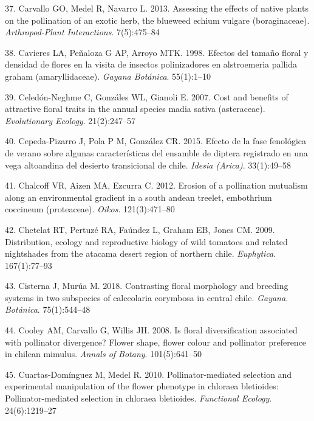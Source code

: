 \documentclass[
]{article}
\begin{document}
\leavevmode\hypertarget{ref-RN115}{}%
37. Carvallo GO, Medel R, Navarro L. 2013. Assessing the effects of
native plants on the pollination of an exotic herb, the blueweed echium
vulgare (boraginaceae). \emph{Arthropod-Plant Interactions}.
7(5):475--84

\leavevmode\hypertarget{ref-RN168}{}%
38. Cavieres LA, Peñaloza G AP, Arroyo MTK. 1998. Efectos del tamaño
floral y densidad de flores en la visita de insectos polinizadores en
alstroemeria pallida graham (amaryllidaceae). \emph{Gayana Botánica}.
55(1):1--10

\leavevmode\hypertarget{ref-RN116}{}%
39. Celedón-Neghme C, Gonzáles WL, Gianoli E. 2007. Cost and benefits of
attractive floral traits in the annual species madia sativa
(asteraceae). \emph{Evolutionary Ecology}. 21(2):247--57

\leavevmode\hypertarget{ref-RN23}{}%
40. Cepeda-Pizarro J, Pola P M, González CR. 2015. Efecto de la fase
fenológica de verano sobre algunas características del ensamble de
diptera registrado en una vega altoandina del desierto transicional de
chile. \emph{Idesia (Arica)}. 33(1):49--58

\leavevmode\hypertarget{ref-RN24}{}%
41. Chalcoff VR, Aizen MA, Ezcurra C. 2012. Erosion of a pollination
mutualism along an environmental gradient in a south andean treelet,
embothrium coccineum (proteaceae). \emph{Oikos}. 121(3):471--80

\leavevmode\hypertarget{ref-RN25}{}%
42. Chetelat RT, Pertuzé RA, Faúndez L, Graham EB, Jones CM. 2009.
Distribution, ecology and reproductive biology of wild tomatoes and
related nightshades from the atacama desert region of northern chile.
\emph{Euphytica}. 167(1):77--93

\leavevmode\hypertarget{ref-RN26}{}%
43. Cisterna J, Murúa M. 2018. Contrasting floral morphology and
breeding systems in two subspecies of calceolaria corymbosa in central
chile. \emph{Gayana. Botánica}. 75(1):544--48

\leavevmode\hypertarget{ref-RN117}{}%
44. Cooley AM, Carvallo G, Willis JH. 2008. Is floral diversification
associated with pollinator divergence? Flower shape, flower colour and
pollinator preference in chilean mimulus. \emph{Annals of Botany}.
101(5):641--50

\leavevmode\hypertarget{ref-RN118}{}%
45. Cuartas-Domínguez M, Medel R. 2010. Pollinator-mediated selection
and experimental manipulation of the flower phenotype in chloraea
bletioides: Pollinator-mediated selection in chloraea bletioides.
\emph{Functional Ecology}. 24(6):1219--27
\end{document}
